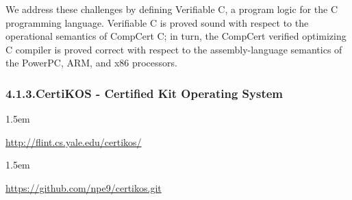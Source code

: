 \documentclass[12pt,twoside]{article}
\begin{document}
\noindent{}We address these challenges by defining Verifiable C, a program logic
for the C programming language. Verifiable C is proved sound with
respect to the operational semantics of CompCert C; in turn, the
CompCert verified optimizing C compiler is proved correct with respect
to the assembly-language semantics of the PowerPC, ARM, and x86
processors.%

\subsubsection{4.1.3.\hspace*{0.5em}CertiKOS - Certified Kit Operating System}\label{sec-certikos---certified-kit-operating-system}%

\begin{mddefinitions}%


\begin{mdbmarginx}{}{}{}{1.5em}%
\begin{mddefdata}%
\href{http://flint.cs.yale.edu/certikos/}{{\ttfamily http://\hspace{0pt}flint.\hspace{0pt}cs.\hspace{0pt}yale.\hspace{0pt}edu/\hspace{0pt}certikos/\hspace{0pt}}}
\end{mddefdata}%
\end{mdbmarginx}%


\begin{mdbmarginx}{}{}{}{1.5em}%
\begin{mddefdata}%
\href{https://github.com/npe9/certikos.git}{{\ttfamily https://\hspace{0pt}github.\hspace{0pt}com/\hspace{0pt}npe9/\hspace{0pt}certikos.\hspace{0pt}git}}%
\end{mddefdata}%
\end{mdbmarginx}%
\end{mddefinitions}%
\end{document}
